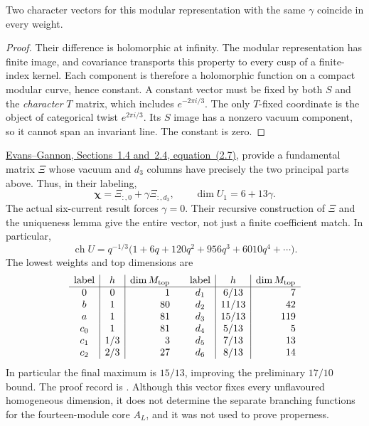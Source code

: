 \begin{lemma}
Two character vectors for this modular representation with the same
$\gamma$ coincide in every weight.
\end{lemma}
\begin{proof}
Their difference is holomorphic at infinity. The modular representation
has finite image, and covariance transports this property to every cusp
of a finite-index kernel. Each component is therefore a holomorphic
function on a compact modular curve, hence constant. A constant vector
must be fixed by both $S$ and the \emph{character} $T$ matrix, which
includes $e^{-2\pi i/3}$. The only $T$-fixed coordinate is the object
of categorical twist $e^{2\pi i/3}$. Its $S$ image has a nonzero vacuum
component, so it cannot span an invariant line. The constant is zero.
\end{proof}

\href{https://arxiv.org/pdf/1006.1326}{Evans--Gannon, Sections~1.4
and~2.4, equation~(2.7)}, provide a fundamental matrix $\Xi$ whose
vacuum and $d_3$ columns have precisely the two principal parts above.
Thus, in their labeling,
\[
 \boldsymbol\chi=\Xi_{:,0}+\gamma\Xi_{:,d_3},
 \qquad\dim U_1=6+13\gamma.
\]
The actual six-current result forces $\gamma=0$. Their recursive
construction of $\Xi$ and the uniqueness lemma give the entire vector,
not just a finite coefficient match. In particular,
\begin{equation}
 \operatorname{ch}U
 =q^{-1/3}\bigl(1+6q+120q^2+956q^3+6010q^4+\cdots\bigr).
 \label{eq:vacuum-character}
\end{equation}
The lowest weights and top dimensions are
\[
\begin{array}{c|c|r@{\qquad}c|c|r}
 \text{label}&h&\dim M_{\rm top}&\text{label}&h&\dim M_{\rm top}\\\hline
 0&0&1&d_1&6/13&7\\
 b&1&80&d_2&11/13&42\\
 a&1&81&d_3&15/13&119\\
 c_0&1&81&d_4&5/13&5\\
 c_1&1/3&3&d_5&7/13&13\\
 c_2&2/3&27&d_6&8/13&14
\end{array}
\]
In particular the final maximum is $15/13$, improving the preliminary
$17/10$ bound. The proof record is
.
Although this vector fixes every unflavoured homogeneous dimension,
it does not determine the separate branching functions for the
fourteen-module core $A_L$, and it was not used to prove properness.
